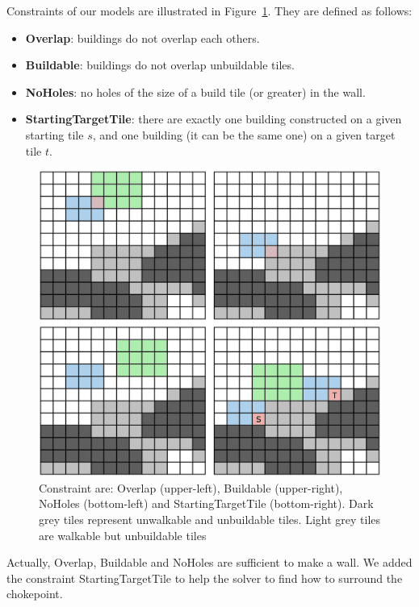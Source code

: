 \documentclass[journal]{IEEEtran}
\begin{document}
Constraints     of      our     models     are      illustrated     in
Figure~\ref{fig:wall_constraint}. They are defined as follows:
\begin{itemize}
\item {\bf Overlap}: buildings do not overlap each others.
\item {\bf Buildable}: buildings do not overlap unbuildable tiles.
\item {\bf NoHoles}: no holes of the size of a build tile (or greater)
  in the wall.
\item  {\bf  StartingTargetTile}:  there   are  exactly  one  building
  constructed on a  given starting tile $s$, and one  building (it can
  be the same one) on a given target tile $t$.
\end{itemize}
\begin{figure}[htb]
  \centering
  \includegraphics[width=\columnwidth]{figs/all_constraints.png}
  \caption{Constraint    are:    Overlap    (upper-left),    Buildable
    (upper-right),   NoHoles   (bottom-left)  and   StartingTargetTile
    (bottom-right).    Dark  grey   tiles  represent   unwalkable  and
    unbuildable tiles.  Light grey  tiles are walkable but unbuildable
    tiles}
  \label{fig:wall_constraint}
\end{figure}
Actually,  Overlap, Buildable  and NoHoles  are sufficient  to make  a
wall. We added the constraint StartingTargetTile to help the solver to
find how to surround the chokepoint.
\end{document}
